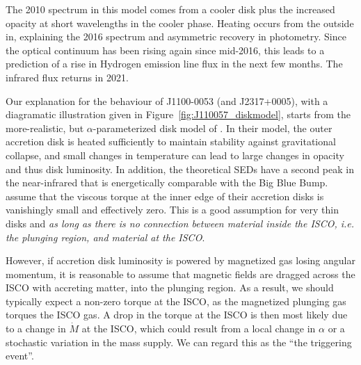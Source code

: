\documentclass[a4paper,fleqn,usenatbib]{mnras}
\begin{document}
The 2010 spectrum in this model comes from a cooler disk plus the
increased opacity at short wavelengths in the cooler phase. Heating
occurs from the outside in, explaining the 2016 spectrum and
asymmetric recovery in photometry.  Since the
optical continuum has been rising again since mid-2016, this leads to
a prediction of a rise in Hydrogen emission line flux in the next few
months. The infrared flux returns in 2021. 

Our explanation for the behaviour of J1100-0053 (and J2317+0005), with
a diagramatic illustration given in
Figure~\ref{fig:J110057_diskmodel}, starts from the more-realistic,
but $\alpha$-parameterized disk model of \citet{Sirko_Goodman2003}. In
their model, the outer accretion disk is heated sufficiently to
maintain stability against gravitational collapse, and small changes
in temperature can lead to large changes in opacity and thus disk
luminosity. In addition, the theoretical SEDs have a second peak in
the near-infrared that is energetically comparable with the Big Blue
Bump. \citet{Sirko_Goodman2003} assume that the viscous torque at the
inner edge of their accretion disks is vanishingly small and
effectively zero. This is a good assumption for very thin disks and
\emph{as long as there is no connection between material inside the
ISCO, i.e. the plunging region, and material at the ISCO}.

However, if accretion disk luminosity is powered by magnetized gas
losing angular momentum, it is reasonable to assume that magnetic
fields are dragged across the ISCO with accreting matter, into the
plunging region. As a result, we should typically expect a non-zero
torque at the ISCO, as the magnetized plunging gas torques the ISCO
gas. A drop in the torque at the ISCO is then most likely due to a
change in $\dot{M}$ at the ISCO, which could result from a local
change in $\alpha$ or a stochastic variation in the mass supply. We
can regard this as the ``the triggering event''.
\end{document}
